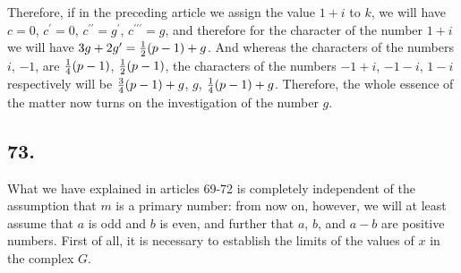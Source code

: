 \documentclass[twoside,12pt]{memoir}
\let\oldfrac\frac
\def\frac#1#2{\mathchoice{\tfrac{#1}{#2}}{\oldfrac{#1}{#2}}{\genfrac{}{}{}{2}{#1}{#2\mathstrut}}{\genfrac{}{}{}{3}{#1}{#2\mathstrut}}}
\begin{document}
Therefore, if in the preceding article we assign the value \(1+i\) to \(k\), we will have \(c=0\), \(c^{\prime}=0\), \(c^{\prime\prime}=g^{\prime}\), \(c^{\prime\prime\prime}=g\), and therefore for the character of the number \(1+i\) we will have \(3g+2g^{\prime} = \frac{1}{2}(p-1)+g\). And whereas the characters of the numbers \(i\), \(-1\), are \(\frac{1}{4}(p-1)\), \(\frac{1}{2}(p-1)\), the characters of the numbers \(-1+i\), \(-1-i\), \(1-i\) respectively will be \(\frac{3}{4}(p-1)+g\), \(g\), \(\frac{1}{4}(p-1)+g\). Therefore, the whole essence of the matter now turns on the investigation of the number \(g\).

\subsection*{73.}

What we have explained in articles 69-72 is completely independent of the assumption that \(m\) is a primary number: from now on, however, we will at least assume that \(a\) is odd and \(b\) is even, and further that \(a\), \(b\), and \(a-b\) are positive numbers. First of all, it is necessary to establish the limits of the values of \(x\) in the complex \(G\).\pagebreak%
\end{document}
